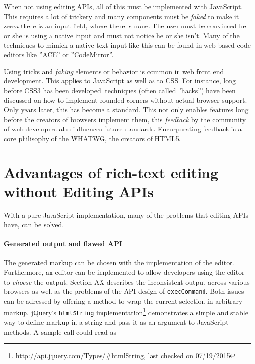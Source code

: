 When not using editing APIs, all of this must be implemented with JavaScript. This requires a lot of trickery and many components must be \textit{faked} to make it \textit{seem} there is an input field, where there is none. The user must be convinced he or she is using a native input and must not notice he or she isn't. Many of the techniques to mimick a native text input like this can be found in web-based code editors like ''ACE'' or ''CodeMirror''.

Using tricks and \textit{faking} elements or behavior is common in web front end development. This applies to JavaScript as well as to CSS. For instance, long before CSS3 has been developed, techniques (often called ''hacks'') have been discussed on how to implement rounded corners without actual browser support. Only years later, this has become a standard. This not only enables features long before the creators of browsers implement them, this \textit{feedback} by the community of web developers also influences future standards. Encorporating feedback is a core philisophy of the WHATWG, the creators of HTML5.


\section{Advantages of rich-text editing without Editing APIs}

With a pure JavaScript implementation, many of the problems that editing APIs have, can be solved.

\paragraph{Generated output and flawed API} The generated markup can be chosen with the implementation of the editor. Furthermore, an editor can be implemented to allow developers using the editor to \textit{choose} the output. Section AX describes the inconsistent output across various browsers as well as the problems of the API design of \texttt{execCommand}. Both issues can be adressed by offering a method to wrap the current selection in arbitrary markup. jQuery's \texttt{htmlString} implementation\footnote{\url{http://api.jquery.com/Types/\#htmlString}, last checked on 07/19/2015} demonstrates a simple and stable way to define markup in a string and pass it as an argument to JavaScript methods. A sample call could read as

